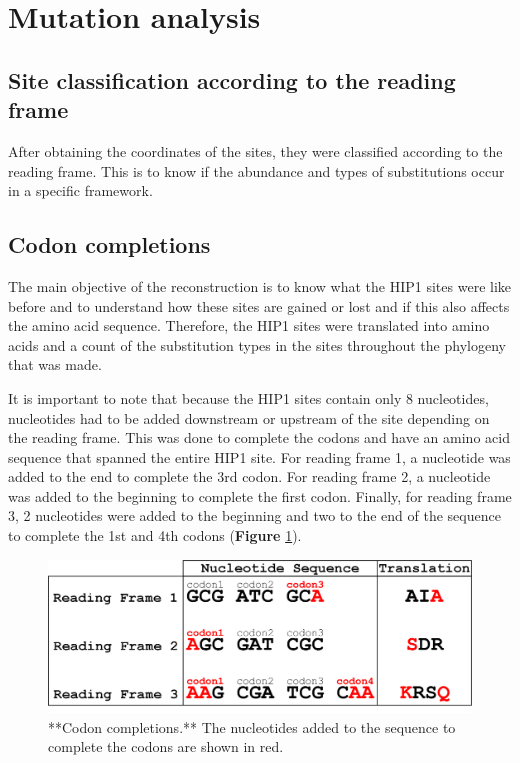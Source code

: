 \documentclass[
]{book}
\begin{document}
\hypertarget{mutation-analysis}{%
\section{Mutation analysis}\label{mutation-analysis}}

\hypertarget{site-classification-according-to-the-reading-frame}{%
\subsection{Site classification according to the reading frame}\label{site-classification-according-to-the-reading-frame}}

After obtaining the coordinates of the sites, they were classified according to the reading frame. This is to know if the abundance and types of substitutions occur in a specific framework.

\hypertarget{codon-completions}{%
\subsection{Codon completions}\label{codon-completions}}

The main objective of the reconstruction is to know what the HIP1 sites were like before and to understand how these sites are gained or lost and if this also affects the amino acid sequence. Therefore, the HIP1 sites were translated into amino acids and a count of the substitution types in the sites throughout the phylogeny that was made.

It is important to note that because the HIP1 sites contain only 8 nucleotides, nucleotides had to be added downstream or upstream of the site depending on the reading frame. This was done to complete the codons and have an amino acid sequence that spanned the entire HIP1 site. For reading frame 1, a nucleotide was added to the end to complete the 3rd codon. For reading frame 2, a nucleotide was added to the beginning to complete the first codon. Finally, for reading frame 3, 2 nucleotides were added to the beginning and two to the end of the sequence to complete the 1st and 4th codons (\textbf{Figure} \ref{fig:FIG44x}).

\begin{figure}

{\centering \includegraphics[width=1\linewidth]{figures/4x/codon_completions} 

}

\caption{**Codon completions.** The nucleotides added to the sequence to complete the codons are shown in red.}\label{fig:FIG44x}
\end{figure}
\end{document}

